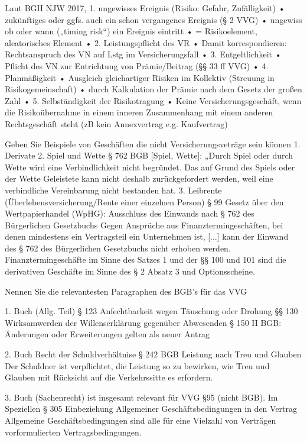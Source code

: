 Laut BGH NJW 2017,
1. ungewisses Ereignis (Risiko: Gefahr, Zufälligkeit)
• zukünftiges oder ggfs. auch ein schon vergangenes Ereignis (§ 2 VVG)
• ungewiss ob oder wann („timing risk“) ein Ereignis eintritt
• = Risikoelement, aleatorisches Element
• 2. Leistungspflicht des VR
• Damit korrespondieren: Rechtsanspruch des VN auf Lstg im Versicherungsfall
• 3. Entgeltlichkeit
• Pflicht des VN zur Entrichtung von Prämie/Beitrag (§§ 33 ff VVG)
• 4. Planmäßigkeit
• Ausgleich gleichartiger Risiken im Kollektiv (Streuung in Risikogemeinschaft)
• durch Kalkulation der Prämie nach dem Gesetz der großen Zahl
• 5. Selbständigkeit der Risikotragung
• Keine Versicherungsgeschäft, wenn die Risikoübernahme in einem inneren
Zusammenhang mit einem anderen Rechtsgeschäft steht (zB kein Annexvertrag e.g. Kaufvertrag)

Geben Sie Beispiele von Geschäften die nicht Versicherungsveträge sein können
1. Derivate
2. Spiel und Wette
§ 762 BGB [Spiel, Wette]: „Durch Spiel oder durch
Wette wird eine Verbindlichkeit nicht begründet. Das auf
Grund des Spiels oder der Wette Geleistete kann nicht
deshalb zurückgefordert werden, weil eine verbindliche
Vereinbarung nicht bestanden hat.
3. Leibrente (Überlebensversicherung/Rente einer einzelnen Person)
§ 99 Gesetz über den Wertpapierhandel (WpHG): Ausschluss des
Einwands nach § 762 des Bürgerlichen Gesetzbuchs
Gegen Ansprüche aus Finanztermingeschäften, bei denen
mindestens ein Vertragsteil ein Unternehmen ist, [...]
kann der Einwand des § 762 des Bürgerlichen Gesetzbuchs nicht
erhoben werden. Finanztermingeschäfte im Sinne des Satzes 1
und der §§ 100 und 101 sind die derivativen Geschäfte im Sinne
des § 2 Absatz 3 und Optionsscheine.


Nennen Sie die relevantesten Paragraphen des BGB's für das VVG

1. Buch (Allg. Teil)
§ 123 Anfechtbarkeit wegen Täuschung oder Drohung
§§ 130 Wirksamwerden der Willenserklärung gegenüber Abwesenden
§ 150 II BGB: Änderungen oder Erweiterungen gelten als neuer Antrag

2. Buch Recht der Schuldverhältnise
§ 242 BGB
Leistung nach Treu und Glauben
Der Schuldner ist verpflichtet, die Leistung so zu bewirken, wie Treu und Glauben mit Rücksicht auf die Verkehrssitte es erfordern.

3. Buch (Sachenrecht)
ist insgesamt relevant für VVG §95 (nicht BGB). Im Speziellen
§ 305 Einbeziehung Allgemeiner Geschäftsbedingungen in den Vertrag
Allgemeine Geschäftsbedingungen sind alle für eine Vielzahl von Verträgen vorformulierten Vertragsbedingungen.

